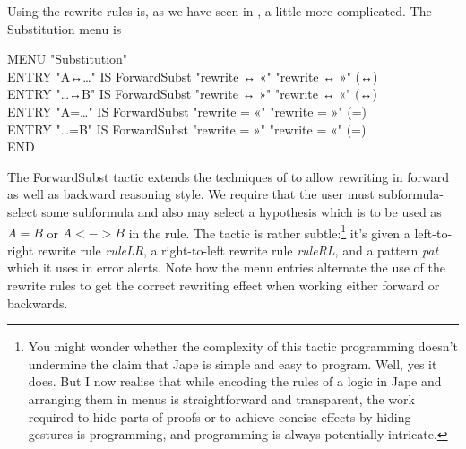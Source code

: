 Using the rewrite rules is, as we have seen in , a little more complicated. The Substitution menu is
\begin{japeish}
MENU "Substitution" \\
\tab ENTRY "A↔\dots"     IS ForwardSubst "rewrite ↔ «" "rewrite ↔ »" (↔) \\
\tab ENTRY "\dots↔B"     IS ForwardSubst "rewrite ↔ »" "rewrite ↔ «" (↔) \\
\tab ENTRY "A=\dots"     IS ForwardSubst "rewrite = «" "rewrite = »" (=) \\
\tab ENTRY "\dots=B"     IS ForwardSubst "rewrite = »" "rewrite = «" (=) \\
END
\end{japeish}

The ForwardSubst tactic extends the techniques of  to allow rewriting in forward as well as backward reasoning style. We require that the user must subformula-select some subformula and also may select a hypothesis which is to be used as $A=B$ or $A<->B$ in the rule. The tactic is rather subtle:\footnote{You might wonder whether the complexity of this tactic programming doesn't undermine the claim that Jape is simple and easy to program. Well, yes it does. But I now realise that while encoding the rules of a logic in Jape and arranging them in menus is straightforward and transparent, the work required to hide parts of proofs or to achieve concise effects by hiding gestures is programming, and programming is always potentially intricate.} it's given a left-to-right rewrite rule \textit{ruleLR}, a right-to-left rewrite rule \textit{ruleRL}, and a pattern \textit{pat} which it uses in error alerts. Note how the menu entries alternate the use of the rewrite rules to get the correct rewriting effect when working either forward or backwards.

